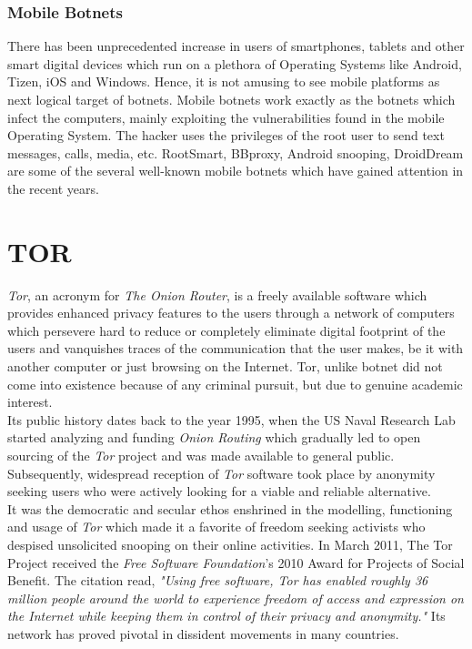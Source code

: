 \documentclass[letterpaper, 10 pt, conference]{ieeeconf}
\begin{document}
\subsubsection{Mobile Botnets}

There has been unprecedented increase in users of smartphones, tablets and other smart digital devices which run on a plethora of Operating Systems like Android, Tizen, iOS and Windows. Hence, it is not amusing to see mobile platforms as next logical target of botnets. Mobile botnets work exactly as the botnets which infect the computers, mainly exploiting the vulnerabilities found in the mobile Operating System. The hacker uses the privileges of the root user to send text messages, calls, media, etc. RootSmart, BBproxy, Android snooping, DroidDream are some of the several well-known mobile botnets which have gained attention in the recent years.

\section{TOR}

\textit{Tor}, an acronym for \textit{The Onion Router}, is a freely available software which provides enhanced privacy features to the users through a network of computers which persevere hard to reduce or completely eliminate digital footprint of the users and vanquishes traces of the communication that the user makes, be it with another computer or just browsing on the Internet. Tor, unlike botnet did not come into existence because of any criminal pursuit, but due to genuine academic interest.\\

Its public history dates back to the year 1995, when the US Naval Research Lab started analyzing and funding \textit{Onion Routing} which gradually led to open sourcing of the \textit{Tor} project and was made available to general public. Subsequently, widespread reception of \textit{Tor} software took place by anonymity seeking users who were actively looking for a viable and reliable alternative.\\

It was the democratic and secular ethos enshrined in the modelling, functioning and usage of \textit{Tor} which made it a favorite of freedom seeking activists who despised unsolicited snooping on their online activities. In March 2011, The Tor Project received the \textit{Free Software Foundation}'s 2010 Award for Projects of Social Benefit. The citation read, \textit{"Using free software, Tor has enabled roughly 36 million people around the world to experience freedom of access and expression on the Internet while keeping them in control of their privacy and anonymity."} Its network has proved pivotal in dissident movements in many countries.\\
\end{document}
